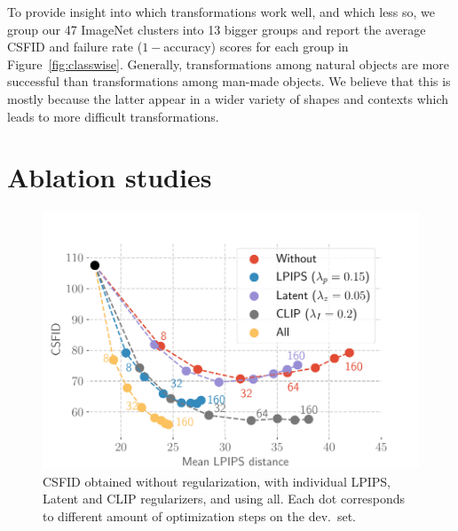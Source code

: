To provide insight into which transformations work well, and which less so, we group 
our 47 ImageNet clusters into 13 bigger groups and report 
the average \ac{CSFID} and failure rate ($1 -$accuracy) scores for each group in Figure~\ref{fig:classwise}.
Generally, transformations among  natural objects are more successful than
 transformations among man-made objects. We believe that this is mostly because the 
 latter appear in a wider variety of shapes and contexts which leads to more difficult 
 transformations.




\section{Ablation studies\label{ablations}}


\begin{figure}[h]
    \centering
    \includegraphics[width=\linewidth]{images/flexit/assets/reg_evol.pdf}
    \caption{\ac{CSFID} obtained without regularization, with individual \ac{LPIPS}, Latent and \ac{CLIP} regularizers, and using all. 
    Each dot corresponds to different amount of optimization steps on the dev.\ set. 
    }
\label{fig:regul}
\end{figure}



